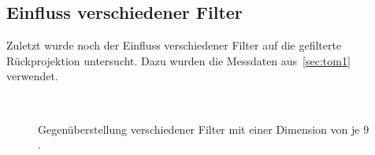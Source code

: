 \documentclass[slug=PET, room=Andreas-Schubert-Bau\,\ 424A, supervisor=Carsten\ Bittrich, coursedate=10.\ 01.\ 2020]{../../Lab_Report_LaTeX/lab_report}
\begin{document}
\subsection{Einfluss verschiedener Filter}
\label{sec:filter}

Zuletzt wurde noch der Einfluss verschiedener Filter auf die gefilterte Rückprojektion
untersucht. Dazu wurden die Messdaten aus~\ref{sec:tom1} verwendet.

\begin{figure}[h]
	\centering
	\\
	\caption{Gegenüberstellung verschiedener Filter mit einer Dimension von je \(9\).}
	\label{fig:filter}
\end{figure}
\end{document}
